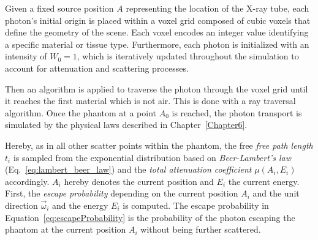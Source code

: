 Given a fixed source position $A$ representing the location of the X-ray tube,
each photon's initial origin is placed within a voxel grid composed of cubic
voxels that define the geometry of the scene. Each voxel encodes an integer
value identifying a specific material or tissue type. Furthermore, each photon
is initialized with an intensity of $W_0=1$, which is iteratively updated
throughout the simulation to account for attenuation and scattering processes.

\begin{figure}[H]
    \centering
\end{figure}

Then an algorithm is applied to traverse the photon through the voxel grid until
it reaches the first material which is not air. This is done with a ray
traversal algorithm. Once the phantom at a point $A_0$ is reached, the photon
transport is simulated by the physical laws described in Chapter~\ref{Chapter6}.

Hereby, as in all other scatter points within the phantom, the free \emph{free
path length} $t_i$ is sampled from the exponential distribution based on
\emph{Beer-Lambert's law} (Eq.~\ref{eq:lambert_beer_law}) and the \emph{total
attenuation coefficient} $\mu(A_i, E_i)$ accordingly. $A_i$ hereby denotes the
current position and $E_i$ the current energy. First, the \emph{escape
probability} depending on the current position $A_i$ and the unit direction
$\vec{\omega}_i$ and the energy $E_i$ is computed. The escape probability in
Equation~\ref{eq:escapeProbability} is the probability of the photon escaping
the phantom at the current position $A_i$ without being further scattered.

